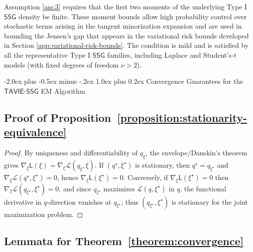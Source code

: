 \documentclass[12pt]{article}
\makeatletter
\def\section{\@startsection{section}{1}{\z@}
  {-2.0ex plus -0.5ex minus -.2ex} %
  {1.0ex plus 0.2ex}               %
  {\normalfont\Large\bfseries}}
\numberwithin{equation}{section}
\newcommand{\ssg}{\mathsf{SSG}}
\newcommand{\tssg}{\mathsf{TAVIE}\text{-}\mathsf{SSG}}
\makeatother
\begin{document}
Assumption \ref{ass:3} requires that the first two moments of the underlying Type I $\ssg$ density be finite. These moment bounds allow high probability control over stochastic terms arising in the tangent minorization expansion and are used in bounding the Jensen's gap that appears in the variational risk bounds developed in Section \ref{app:variational-risk-bounds}. The condition is mild and is satisfied by all the representative Type I $\ssg$ families, including Laplace and Student's-$t$ models (with fixed degrees of freedom $\nu >2$).

\newpage
\section{Convergence Guarantees for the \texorpdfstring{$\tssg$}{TAVIE-SSG} EM Algorithm}\label{app:TAVIE-convergence-proof}

\subsection{Proof of \texorpdfstring{Proposition~\ref{proposition:stationarity-equivalence}}{Proposition 2}}

\begin{proof}
By uniqueness and differentiability of $q_\xi$, the envelope/Danskin's theorem~\citep{Danskin1967} gives $\nabla_{\xi} \mathsf{L}(\xi) =\nabla_\xi\mathcal L(q_\xi,\xi)$.  If $(q^\star,\xi^\star)$ is stationary, then $q^\star=q_{\xi^\star}$ and $\nabla_\xi\mathcal L(q^\star,\xi^\star)=0$, hence $\nabla_{\xi} \mathsf{L}(\xi^\star)=0$.  Conversely, if $\nabla_{\xi} \mathsf{L}(\xi^\star)=0$ then $\nabla_\xi\mathcal L(q_{\xi^\star},\xi^\star)=0$, and since $q_{\xi^\star}$ maximizes $\mathcal{L}(q, \xi^{\star})$ in $q$, the functional derivative in $q$-direction vanishes at $q_{\xi^{\star}}$; thus $(q_{\xi^\star},\xi^\star)$ is stationary for the joint maximization problem. 
\end{proof}

\subsection{Lemmata for \texorpdfstring{Theorem~\ref{theorem:convergence}}{Theorem 1}}\label{app:lemmata-convergence-TAVIE}
\end{document}
